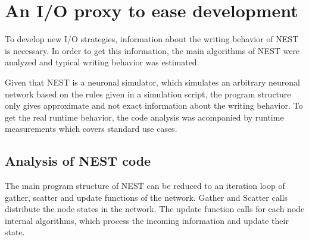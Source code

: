 \documentclass[]{YIC2015}
\begin{document}

\section{An I/O proxy to ease development}

To develop new I/O strategies, information about the writing behavior
of NEST is necessary. In order to get this information, the main
algorithms of NEST were analyzed and typical writing behavior was
estimated.

Given that NEST is a neuronal simulator, which simulates an arbitrary
neuronal network based on the rules given in a simulation script, the
program structure only gives approximate and not exact information
about the writing behavior. To get the real runtime behavior, the code
analysis was acompanied by runtime measurements which covers standard
use cases.

\subsection{Analysis of NEST code}


The main program structure of NEST can be reduced to an iteration loop
of gather, scatter and update functions of the network. Gather and
Scatter calls distribute the node states in the network. The update
function calls for each node internal algorithms, which process the
incoming information and update their state.
\end{document}
